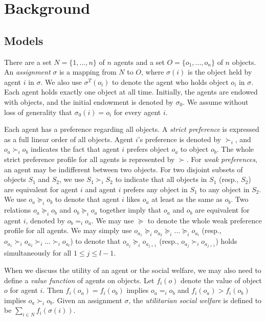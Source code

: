 \section{Background}\label{sec-back}
\subsection{Models}
There are a set $N=\{ 1,...,n\}$ of $n$ agents and a set $O=\{ o_1,...,o_n\}$ of $n$ objects.
An \emph{assignment} $\sigma$ is a mapping from $N$ to $O$, where $\sigma(i)$ is the object held by agent $i$ in $\sigma$.
We also use $\sigma ^T(o_i)$ to denote the agent who holds object $o_i$ in $\sigma$.
Each agent holds exactly one object at all time.
Initially, the agents are endowed with objects, and the initial endowment is denoted by $\sigma _0$.
We assume without loss of generality that $\sigma _0(i)=o_i$ for every agent $i$.


Each agent has a preference regarding all objects.
A \emph{strict preference} is expressed as a full linear order of all objects.
Agent $i$'s preference is denoted by $\succ _i$, and $o_a\succ _i o_b$ indicates the fact that agent $i$ prefers object $o_a$ to object $o_b$. The whole strict preference profile for all agents is represented by $\succ$.
For \emph{weak preferences}, an agent may be indifferent between two objects.
For two disjoint subsets of objects $S_1$ and $S_2$, we use $S_1\succ _i S_2$ to indicate that all objects in $S_1$ (resp., $S_2$)
are equivalent for agent $i$ and agent $i$ prefers any object in $S_1$ to any object in $S_2$.
We use $o_a\succeq_i o_b$ to denote that agent $i$ likes $o_a$ at least as the same as $o_b$. Two relations $o_a\succeq_i o_b$ and $o_b\succeq_i o_a$ together imply that $o_a$ and $o_b$ are equivalent for agent $i$, denoted by $o_b=_i o_a$.
We may use $\succeq$ to denote the whole weak preference profile for all agents.
 We may simply use $o_{a_1}\succeq_i o_{a_2} \succeq_i \dots \succeq_i o_{a_l}$ (resp., $o_{a_1}\succ_i o_{a_2} \succ_i \dots \succ_i o_{a_l}$) to denote that $o_{a_j}\succeq_i o_{a_{j+1}}$ (resp., $o_{a_j}\succ_i o_{a_{j+1}}$) holds simultaneously for all $1\leq j \leq l-1$.

 When we discuss the utility of an agent or the social welfare, we may also need to define a \emph{value function} of agents on objects. Let $f_i(o)$ denote the value of object $o$ for agent $i$.
 Then $f_i(o_a)= f_i(o_b)$ implies $o_{a}=_i o_{b}$ and $f_i(o_a)> f_i(o_b)$ implies $o_{a}\succ_i o_{b}$. Given an assignment $\sigma$, the \emph{utilitarian social welfare} is defined to be
 $\sum_{i\in N}f_i(\sigma(i))$.



